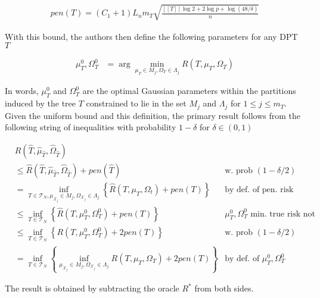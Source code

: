 \begin{align}
  pen(T) = (C_1 + 1) L_n m_T \sqrt{\frac{[[T]] \log 2 + 2 \log p + \log(48/\delta)}{n}}
\end{align}

With this bound, the authors then define the following parameters for
any DPT $T$

\begin{align}
  \mu_T^0, \Omega_T^0 &= \arg\min_{\mu_T \in M_j, \Omega_T \in \Lambda_j} R(T, \mu_T, \Omega_T)
\end{align}

In words, $\mu_T^0$ and $\Omega_T^0$ are the optimal Gaussian
parameters within the partitions induced by the tree $T$ constrained
to lie in the set $M_j$ and $\Lambda_j$ for $1 \le j \le m_T$. Given
the uniform bound and this definition, the primary result follows from
the following string of inequalities with probability $1-\delta$ for
$\delta \in (0, 1)$

\begin{align}
  &R(\hat{T}, \hat{\mu}_{\hat{T}}, \hat{\Omega}_{\hat{T}}) & \\
  &\le \hat{R}(\hat{T}, \hat{\mu}_{\hat{T}}, \hat{\Omega}_{\hat{T}}) + pen(\hat{T}) & \text{w. prob } (1 - \delta/2) \\
  &= \inf_{T \in \mathcal{T}_N, \mu_{\mathcal{X}_j} \in M_j, \Omega_{\mathcal{X}_j} \in \Lambda_j}
  \left\{
    \hat{R}(T, \mu_T, \Omega_t) + pen(T)
  \right\} & \text{by def. of pen. risk est.} \\
  &\le \inf_{T \in \mathcal{T}_N}
  \left\{
    \hat{R}(T, \mu_T^0, \Omega_T^0) + pen(T)
  \right\} & \mu_T^0, \Omega_T^0 \text{ min. true risk not emp. risk} \\
  &\le \inf_{T \in \mathcal{T}_N}
  \left\{
    R(T, \mu_T^0, \Omega_T^0) + 2pen(T)
  \right\} & \text{w. prob } (1 - \delta/2) \\
  &= \inf_{T \in \mathcal{T}_N}
  \left\{
    \inf_{\mu_{\mathcal{X}_j} \in M_j, \Omega_{\mathcal{X}_j} \in \Lambda_j}
    R(T, \mu_T, \Omega_T) + 2pen(T)
  \right\} & \text{by def. of } \mu_T^0, \Omega_T^0
\end{align}

The result is obtained by subtracting the oracle $R^*$ from both
sides.
